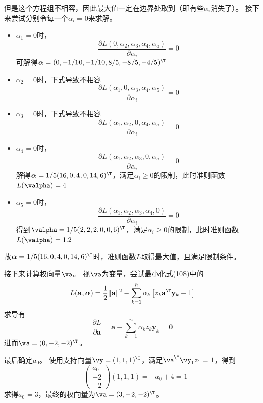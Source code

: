 \documentclass[reportComp]{thesis}
\begin{document}
\begin{answer}
\begin{itemize}
	但是这个方程组不相容，因此最大值一定在边界处取到（即有些$\alpha_i$消失了）。
	接下来尝试分别令每一个$\alpha_i=0$来求解。
	\begin{itemize}
	\item $\alpha_1=0$时，
	\[\frac{\partial L\left(0, \alpha_{2}, \alpha_{3}, \alpha_{4}, \alpha_{5}\right)}{\partial \alpha_{i}}=0\]
	可解得$\boldsymbol{\alpha}=(0,-1/10,-1/10,8/5,-8/5,-4/5)^\T $
	\item $\alpha_2=0$时，下式导致不相容
	\[\frac{\partial L\left(\alpha_{1}, 0, \alpha_{3}, \alpha_{4}, \alpha_{5}\right)}{\partial \alpha_{i}}=0\]
	\item $\alpha_3=0$时，下式导致不相容
	\[\frac{\partial L\left(\alpha_{1}, \alpha_{2}, 0, \alpha_{4}, \alpha_{5}\right)}{\partial \alpha_{i}}=0\]
	\item $\alpha_4=0$时，
	\[\frac{\partial L\left(\alpha_{1}, \alpha_{2}, \alpha_{3}, 0, \alpha_{5}\right)}{\partial \alpha_{i}}=0\]
	解得$\boldsymbol{\alpha}=1/5(16,0,4,0,14,6)^\T $，满足$\alpha_i\geq 0$的限制，此时准则函数$L(\valpha)=4$
	\item $\alpha_5=0$时，
	\[\frac{\partial L\left(\alpha_{1}, \alpha_{2}, \alpha_{3}, \alpha_{4}, 0\right)}{\partial \alpha_{i}}=0\]
	得到$\valpha=1 / 5(2,2,2,0,0,6)^\T $，满足$\alpha_i\geq 0$的限制，此时准则函数$L(\valpha)=1.2$
	\end{itemize}
	故$\boldsymbol{\alpha}=1/5(16,0,4,0,14,6)^\T $时，准则函数$L$取得最大值，且满足限制条件。

	接下来计算权向量$\va$。
	视$\va$为变量，尝试最小化式(108)中的
	\[L(\mathbf{a}, \boldsymbol{\alpha})=\frac{1}{2}\|\mathbf{a}\|^{2}-\sum_{k=1}^{n} \alpha_{k}\left[z_{k} \mathbf{a}^\T  \mathbf{y}_{k}-1\right]\]
	求导有
	\[\frac{\partial L}{\partial \mathbf{a}}=\mathbf{a}-\sum_{k=1}^{n} \alpha_{k} z_{k} \mathbf{y}_{k}=\mathbf{0}\]
	进而$\va=(0,-2,-2)^\T $。

	最后确定$a_0$。
	使用支持向量$\vy=(1,1,1)^\T $，满足$\va^\T \vy_1z_1=1$，得到
	\[-\left(\begin{array}{c}{a_0} \\ {-2} \\ {-2}\end{array}\right)(1,1,1)=-a_{0}+4=1\]
	求得$a_0=3$，最终的权向量为$\va=(3,-2,-2)^\T $。
\end{itemize}
\end{answer}
\end{document}
